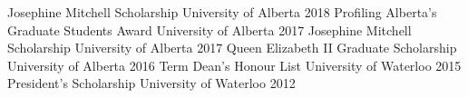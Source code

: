 \begin{cvhonors}
    \cvhonor
    {Josephine Mitchell Scholarship}
    {University of Alberta}
    {2018}
  \cvhonor
    {Profiling Alberta's Graduate Students Award}
    {University of Alberta}
    {2017}
  \cvhonor
    {Josephine Mitchell Scholarship}
    {University of Alberta}
    {2017}
  \cvhonor
    {Queen Elizabeth II Graduate Scholarship}
    {University of Alberta}
    {2016}
  \cvhonor
    {Term Dean's Honour List}
    {University of Waterloo}
    {2015}
  \cvhonor
    {President's Scholarship}
    {University of Waterloo}
    {2012}
\end{cvhonors}
